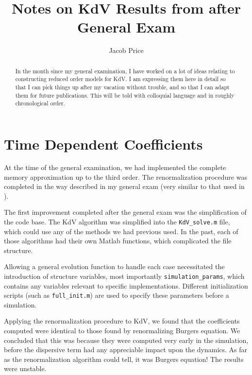\documentclass{article}
\title{Notes on KdV Results from after General Exam}
\author{Jacob Price}
\begin{document}
\maketitle

\begin{abstract}
In the month since my general examination, I have worked on a lot of ideas relating to constructing reduced order models for KdV. I am expressing them here in detail so that I can pick things up after my vacation without trouble, and so that I can adapt them for future publications. This will be told with colloquial language and in roughly chronological order.
\end{abstract}

\section{Time Dependent Coefficients}

At the time of the general examination, we had implemented the complete memory approximation up to the third order. The renormalization procedure was completed in the way described in my general exam (very similar to that used in \cite{stinis2015renormalized}).

The first improvement completed after the general exam was the simplification of the code base. The KdV algorithm was simplified into the \verb!KdV_solve.m! file, which could use any of the methods we had previous used. In the past, each of those algorithms had their own Matlab functions, which complicated the file structure.

Allowing a general evolution function to handle each case necessitated the introduction of structure variables, most importantly \verb!simulation_params!, which contains any variables relevant to specific implementations. Different initialization scripts (such as \verb!full_init.m!) are used to specify these parameters before a simulation.

Applying the renormalization procedure to KdV, we found that the coefficients computed were identical to those found by renormalizing Burgers equation. We concluded that this was because they were computed very early in the simulation, before the dispersive term had any appreciable impact upon the dynamics. As far as the renormalization algorithm could tell, it was Burgers equation! The results were unstable.
\end{document}
